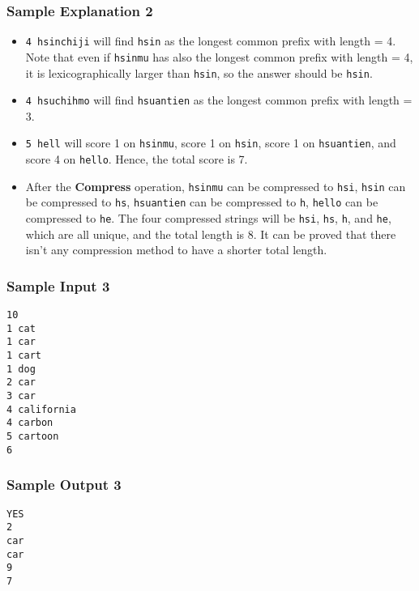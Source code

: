 \subsubsection{Sample Explanation 2}

\begin{itemize}
    \item \texttt{4 hsinchiji} will find \texttt{hsin} as the longest common prefix with length = 4. Note that even if \texttt{hsinmu} has also the longest common prefix with length = 4, it is lexicographically larger than \texttt{hsin}, so the answer should be \texttt{hsin}.
    \item \texttt{4 hsuchihmo} will find \texttt{hsuantien} as the longest common prefix with length = 3.
    \item \texttt{5 hell} will score 1 on \texttt{hsinmu}, score 1 on \texttt{hsin}, score 1 on \texttt{hsuantien}, and score 4 on \texttt{hello}. Hence, the total score is 7.
    \item After the \textbf{Compress} operation, \texttt{hsinmu} can be compressed to \texttt{hsi}, \texttt{hsin} can be compressed to \texttt{hs}, \texttt{hsuantien} can be compressed to \texttt{h}, \texttt{hello} can be compressed to \texttt{he}. The four compressed strings will be \texttt{hsi}, \texttt{hs}, \texttt{h}, and \texttt{he}, which are all unique, and the total length is 8. It can be proved that there isn't any compression method to have a shorter total length.
\end{itemize}

\newpage

\begin{multicols}{2}
\subsubsection{Sample Input 3}
\begin{verbatim}
10
1 cat
1 car
1 cart
1 dog
2 car
3 car
4 california
4 carbon
5 cartoon
6
\end{verbatim}
\columnbreak
\subsubsection{Sample Output 3}
\begin{verbatim}
YES
2
car
car
9
7





\end{verbatim}
\end{multicols}